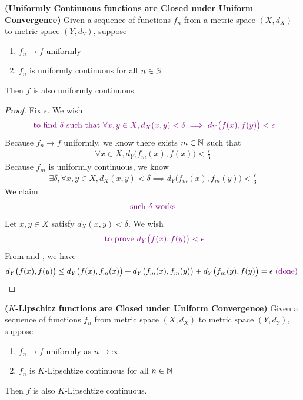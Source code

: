 \documentclass{report}
\begin{document}
\begin{theorem}
\textbf{(Uniformly Continuous functions are Closed under Uniform Convergence)} Given a sequence of functions $f_n$ from a metric space  $(X,d_X)$ to metric space $(Y,d_Y)$, suppose 
\begin{enumerate}[label=(\alph*)]
  \item $f_n\to f$ uniformly 
  \item $f_n$ is uniformly continuous for all  $n\in\mathbb{N}$
\end{enumerate}
Then $f$ is also uniformly continuous
\end{theorem}
\begin{proof}
Fix $\epsilon $. We wish 
\begin{align*}
\textcolor{violet}{\text{ to find $\delta$ such that $\forall x,y \in X, d_X(x,y)<\delta \implies d_Y\big(f(x),f(y) \big)<\epsilon $}}
\end{align*}
Because $f_n\to f$ uniformly, we know there exists  $m \in\mathbb{N}$ such that 
\begin{align}
\label{L1}
\forall x \in X, d_Y\big(f_m(x),f(x) \big)<\frac{\epsilon}{3}
\end{align}
Because $f_m$ is uniformly continuous, we know 
\begin{align}
\label{L2}
\exists \delta, \forall x,y \in X, d_X(x,y)<\delta \implies d_Y\big(f_m(x),f_m(y) \big)<\frac{\epsilon}{3}
\end{align}
We claim 
\begin{align*}
\text{ \textcolor{violet}{such $\delta$ works} }
\end{align*}
Let $x,y \in X$ satisfy $d_X(x,y)<\delta$. We wish 
\begin{align*}
\textcolor{violet}{\text{ to prove }d_Y\big(f(x),f(y) \big)<\epsilon }
\end{align*}
From  and , we have 
\begin{align*}
d_Y\big(f(x),f(y) \big)\leq d_Y\big(f(x),f_m(x) \big)+d_Y\big(f_m(x),f_m(y) \big)+d_Y\big(f_m(y),f(y) \big)=\epsilon \textcolor{violet}{\text{ (done) }}
\end{align*}
\end{proof}
\begin{theorem}
\textbf{($K$-Lipschitz functions are Closed under Uniform Convergence)} Given a sequence of functions $f_n$ from metric space $(X,d_X)$ to metric space $(Y,d_Y)$, suppose 
\begin{enumerate}[label=(\alph*)]
  \item $f_n\to f$ uniformly as $n\to \infty$ 
  \item $f_n$ is $K$-Lipschtize continuous for all $n\in\mathbb{N}$
\end{enumerate}
Then $f$ is also $K$-Lipschtize continuous. 
\end{theorem}
\end{document}

